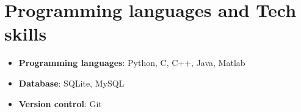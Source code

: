 \documentclass[letterpaper,12pt]{article}
\newcommand{\resumeItem}[2]{
    \item\small{
        \textbf{#1}{: #2 \vspace{-2pt}}
    }
}
\newcommand{\resumeSubItem}[2]{\resumeItem{#1}{#2}\vspace{-4pt}}
\newcommand{\resumeSubHeadingListStart}{\begin{itemize}[leftmargin=*]}
\newcommand{\resumeSubHeadingListEnd}{\end{itemize}}
\begin{document}

\section{Programming languages and Tech skills}
    \resumeSubHeadingListStart
        \resumeSubItem{Programming languages}
        {Python, C, C++, Java, Matlab}
        \resumeSubItem{Database}
        {SQLite, MySQL}
        \resumeSubItem{Version control}
        {Git}
    \resumeSubHeadingListEnd

\end{document}

